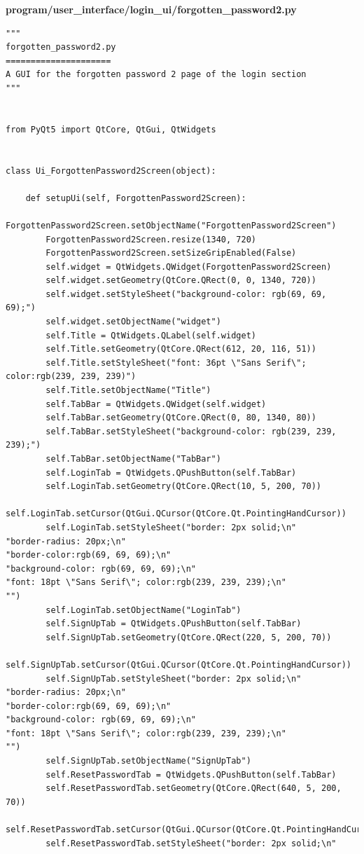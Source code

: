 \documentclass{article}
\begin{document}
\textbf{program/user\_interface/login\_ui/forgotten\_password2.py}
\begin{lstlisting}
"""
forgotten_password2.py
=====================
A GUI for the forgotten password 2 page of the login section
"""


from PyQt5 import QtCore, QtGui, QtWidgets


class Ui_ForgottenPassword2Screen(object):

    def setupUi(self, ForgottenPassword2Screen):
        ForgottenPassword2Screen.setObjectName("ForgottenPassword2Screen")
        ForgottenPassword2Screen.resize(1340, 720)
        ForgottenPassword2Screen.setSizeGripEnabled(False)
        self.widget = QtWidgets.QWidget(ForgottenPassword2Screen)
        self.widget.setGeometry(QtCore.QRect(0, 0, 1340, 720))
        self.widget.setStyleSheet("background-color: rgb(69, 69, 69);")
        self.widget.setObjectName("widget")
        self.Title = QtWidgets.QLabel(self.widget)
        self.Title.setGeometry(QtCore.QRect(612, 20, 116, 51))
        self.Title.setStyleSheet("font: 36pt \"Sans Serif\"; color:rgb(239, 239, 239)")
        self.Title.setObjectName("Title")
        self.TabBar = QtWidgets.QWidget(self.widget)
        self.TabBar.setGeometry(QtCore.QRect(0, 80, 1340, 80))
        self.TabBar.setStyleSheet("background-color: rgb(239, 239, 239);")
        self.TabBar.setObjectName("TabBar")
        self.LoginTab = QtWidgets.QPushButton(self.TabBar)
        self.LoginTab.setGeometry(QtCore.QRect(10, 5, 200, 70))
        self.LoginTab.setCursor(QtGui.QCursor(QtCore.Qt.PointingHandCursor))
        self.LoginTab.setStyleSheet("border: 2px solid;\n"
"border-radius: 20px;\n"
"border-color:rgb(69, 69, 69);\n"
"background-color: rgb(69, 69, 69);\n"
"font: 18pt \"Sans Serif\"; color:rgb(239, 239, 239);\n"
"")
        self.LoginTab.setObjectName("LoginTab")
        self.SignUpTab = QtWidgets.QPushButton(self.TabBar)
        self.SignUpTab.setGeometry(QtCore.QRect(220, 5, 200, 70))
        self.SignUpTab.setCursor(QtGui.QCursor(QtCore.Qt.PointingHandCursor))
        self.SignUpTab.setStyleSheet("border: 2px solid;\n"
"border-radius: 20px;\n"
"border-color:rgb(69, 69, 69);\n"
"background-color: rgb(69, 69, 69);\n"
"font: 18pt \"Sans Serif\"; color:rgb(239, 239, 239);\n"
"")
        self.SignUpTab.setObjectName("SignUpTab")
        self.ResetPasswordTab = QtWidgets.QPushButton(self.TabBar)
        self.ResetPasswordTab.setGeometry(QtCore.QRect(640, 5, 200, 70))
        self.ResetPasswordTab.setCursor(QtGui.QCursor(QtCore.Qt.PointingHandCursor))
        self.ResetPasswordTab.setStyleSheet("border: 2px solid;\n"

\end{lstlisting}
\end{document}
